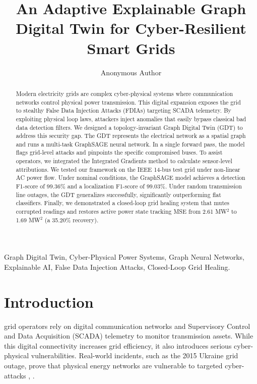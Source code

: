 \documentclass[journal]{IEEEtran}
\begin{document}
\title{An Adaptive Explainable Graph Digital Twin for Cyber-Resilient Smart Grids}

\author{Anonymous Author}

\maketitle

\begin{abstract}
Modern electricity grids are complex cyber-physical systems where communication networks control physical power transmission. This digital expansion exposes the grid to stealthy False Data Injection Attacks (FDIAs) targeting SCADA telemetry. By exploiting physical loop laws, attackers inject anomalies that easily bypass classical bad data detection filters. We designed a topology-invariant Graph Digital Twin (GDT) to address this security gap. The GDT represents the electrical network as a spatial graph and runs a multi-task GraphSAGE neural network. In a single forward pass, the model flags grid-level attacks and pinpoints the specific compromised buses. To assist operators, we integrated the Integrated Gradients method to calculate sensor-level attributions. We tested our framework on the IEEE 14-bus test grid under non-linear AC power flow. Under nominal conditions, the GraphSAGE model achieves a detection F1-score of 99.36\% and a localization F1-score of 99.03\%. Under random transmission line outages, the GDT generalizes successfully, significantly outperforming flat classifiers. Finally, we demonstrated a closed-loop grid healing system that mutes corrupted readings and restores active power state tracking MSE from 2.61 MW$^2$ to 1.69 MW$^2$ (a 35.20\% recovery).
\end{abstract}

\begin{IEEEkeywords}
Graph Digital Twin, Cyber-Physical Power Systems, Graph Neural Networks, Explainable AI, False Data Injection Attacks, Closed-Loop Grid Healing.
\end{IEEEkeywords}

\section{Introduction}
 grid operators rely on digital communication networks and Supervisory Control and Data Acquisition (SCADA) telemetry to monitor transmission assets. While this digital connectivity increases grid efficiency, it also introduces serious cyber-physical vulnerabilities. Real-world incidents, such as the 2015 Ukraine grid outage, prove that physical energy networks are vulnerable to targeted cyber-attacks \cite{b1}, \cite{b9}.
\end{document}
